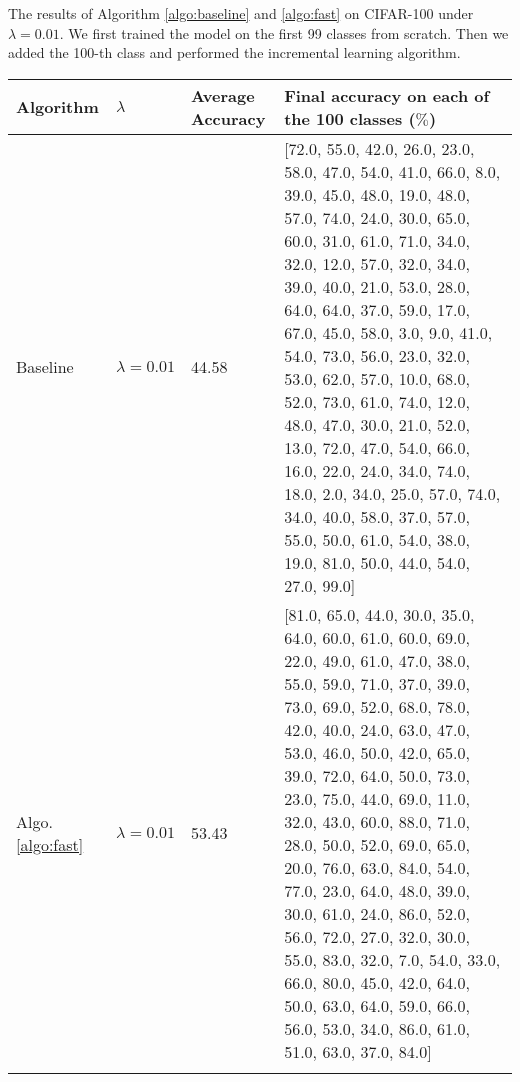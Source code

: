 \begin{table}[!hpb]
	\centering
	{The results of Algorithm \ref{algo:baseline} and \ref{algo:fast} on CIFAR-100 under $\lambda=0.01$. We first trained the model on the first 99 classes from scratch. Then we added the 100-th class and performed the incremental learning algorithm.}
	\begin{tabular}{@{}lllp{8cm}@{}} \toprule
		Algorithm & $\lambda$ &Average Accuracy&  Final accuracy on each of the 100 classes ($\%$)\\ \midrule
		Baseline&$\lambda=0.01$&  44.58& [72.0, 55.0, 42.0, 26.0, 23.0, 58.0, 47.0, 54.0, 41.0, 66.0, 8.0, 39.0, 45.0, 48.0, 19.0, 48.0, 57.0, 74.0, 24.0, 30.0, 65.0, 60.0, 31.0, 61.0, 71.0, 34.0, 32.0, 12.0, 57.0, 32.0, 34.0, 39.0, 40.0, 21.0, 53.0, 28.0, 64.0, 64.0, 37.0, 59.0, 17.0, 67.0, 45.0, 58.0, 3.0, 9.0, 41.0, 54.0, 73.0, 56.0, 23.0, 32.0, 53.0, 62.0, 57.0, 10.0, 68.0, 52.0, 73.0, 61.0, 74.0, 12.0, 48.0, 47.0, 30.0, 21.0, 52.0, 13.0, 72.0, 47.0, 54.0, 66.0, 16.0, 22.0, 24.0, 34.0, 74.0, 18.0, 2.0, 34.0, 25.0, 57.0, 74.0, 34.0, 40.0, 58.0, 37.0, 57.0, 55.0, 50.0, 61.0, 54.0, 38.0, 19.0, 81.0, 50.0, 44.0, 54.0, 27.0, 99.0]\\
		Algo. \ref{algo:fast}&$\lambda=0.01$&  53.43& [81.0, 65.0, 44.0, 30.0, 35.0, 64.0, 60.0, 61.0, 60.0, 69.0, 22.0, 49.0, 61.0, 47.0, 38.0, 55.0, 59.0, 71.0, 37.0, 39.0, 73.0, 69.0, 52.0, 68.0, 78.0, 42.0, 40.0, 24.0, 63.0, 47.0, 53.0, 46.0, 50.0, 42.0,
		65.0, 39.0, 72.0, 64.0, 50.0, 73.0, 23.0, 75.0, 44.0, 69.0, 11.0, 32.0, 43.0, 60.0, 88.0, 71.0, 28.0, 50.0, 52.0, 69.0, 65.0, 20.0, 76.0, 63.0, 84.0, 54.0, 77.0, 23.0, 64.0, 48.0, 39.0, 30.0, 61.0, 24.0,
		86.0, 52.0, 56.0, 72.0, 27.0, 32.0, 30.0, 55.0, 83.0, 32.0, 7.0, 54.0, 33.0, 66.0, 80.0, 45.0, 42.0, 64.0, 50.0, 63.0, 64.0, 59.0, 66.0, 56.0, 53.0, 34.0, 86.0, 61.0, 51.0, 63.0, 37.0, 84.0]
		\\ \bottomrule
		\label{tab:fast0.01}
	\end{tabular}
\end{table}

